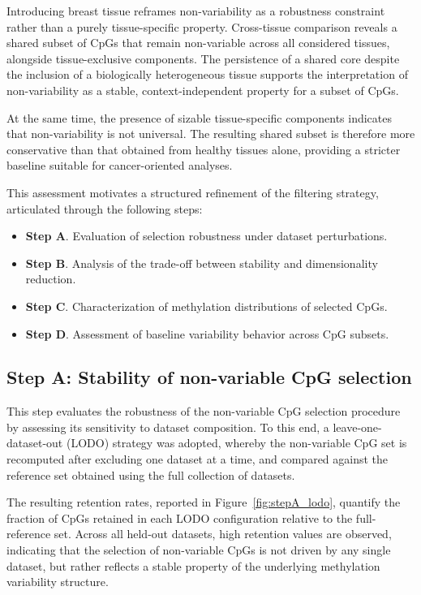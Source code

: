 \documentclass[10pt]{extarticle}
\begin{document}
Introducing breast tissue reframes non-variability as a robustness constraint rather than a purely tissue-specific property. Cross-tissue comparison reveals a shared subset of CpGs that remain non-variable across all considered tissues, alongside tissue-exclusive components. The persistence of a shared core despite the inclusion of a biologically heterogeneous tissue supports the interpretation of non-variability as a stable, context-independent property for a subset of CpGs.

At the same time, the presence of sizable tissue-specific components indicates that non-variability is not universal. The resulting shared subset is therefore more conservative than that obtained from healthy tissues alone, providing a stricter baseline suitable for cancer-oriented analyses.

This assessment motivates a structured refinement of the filtering strategy, articulated through the following steps:
\begin{itemize}[label=-]
\item \textbf{Step A}. Evaluation of selection robustness under dataset perturbations.
\item \textbf{Step B}. Analysis of the trade-off between stability and dimensionality reduction.
\item \textbf{Step C}. Characterization of methylation distributions of selected CpGs.
\item \textbf{Step D}. Assessment of baseline variability behavior across CpG subsets.
\end{itemize}


\subsection{Step A: Stability of non-variable CpG selection}

This step evaluates the robustness of the non-variable CpG selection procedure by assessing its sensitivity to dataset composition. To this end, a leave-one-dataset-out (LODO) strategy was adopted, whereby the non-variable CpG set is recomputed after excluding one dataset at a time, and compared against the reference set obtained using the full collection of datasets.

The resulting retention rates, reported in Figure~\ref{fig:stepA_lodo}, quantify the fraction of CpGs retained in each LODO configuration relative to the full-reference set. Across all held-out datasets, high retention values are observed, indicating that the selection of non-variable CpGs is not driven by any single dataset, but rather reflects a stable property of the underlying methylation variability structure.
\end{document}
